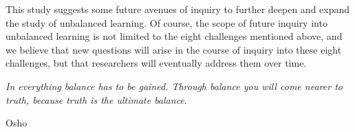 \documentclass[10pt]{article} %
\begin{document}
This study suggests some future avenues of inquiry to further deepen and expand the study of unbalanced learning. Of course, the scope of future inquiry into unbalanced learning is not limited to the eight challenges mentioned above, and we believe that new questions will arise in the course of inquiry into these eight challenges, but that researchers will eventually address them over time.

\epigraph{\emph{In everything balance has to be gained. Through balance you will come nearer to truth, because truth is the ultimate balance}.}{Osho}

\end{document}

